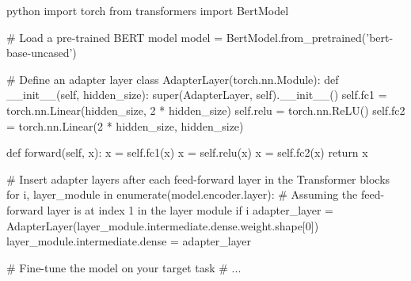 python
import torch
from transformers import BertModel

# Load a pre-trained BERT model
model = BertModel.from_pretrained('bert-base-uncased')

# Define an adapter layer
class AdapterLayer(torch.nn.Module):
    def __init__(self, hidden_size):
        super(AdapterLayer, self).__init__()
        self.fc1 = torch.nn.Linear(hidden_size, 2 * hidden_size)
        self.relu = torch.nn.ReLU()
        self.fc2 = torch.nn.Linear(2 * hidden_size, hidden_size)

    def forward(self, x):
        x = self.fc1(x)
        x = self.relu(x)
        x = self.fc2(x)
        return x

# Insert adapter layers after each feed-forward layer in the Transformer blocks
for i, layer_module in enumerate(model.encoder.layer):
    # Assuming the feed-forward layer is at index 1 in the layer module
    if i %
        adapter_layer = AdapterLayer(layer_module.intermediate.dense.weight.shape[0])
        layer_module.intermediate.dense = adapter_layer

# Fine-tune the model on your target task
# ...
